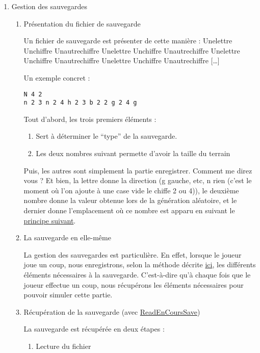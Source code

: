 \documentclass[letter]{article}
\begin{document}
\begin{enumerate}
\item Gestion des sauvegardes
\label{sec:org8335584}

\begin{enumerate}
\item Présentation du fichier de sauvegarde
\label{sec:org7d2c40d}




Un fichier de sauvegarde est présenter de cette manière :
Unelettre Unchiffre Unautrechiffre
Unelettre Unchiffre Unautrechiffre Unelettre Unchiffre Unautrechiffre Unelettre Unchiffre Unautrechiffre [\ldots{}]

Un exemple concret :
\begin{verbatim}
N 4 2
n 2 3 n 2 4 h 2 3 b 2 2 g 2 4 g 
\end{verbatim}

Tout d'abord, les trois premiers éléments :
\begin{enumerate}
\item Sert à déterminer le “type” de la sauvegarde.
\item Les deux nombres suivant permette d'avoir la taille du terrain
\end{enumerate}

Puis, les autres sont simplement la partie enregistrer.
Comment me direz vous ?
Et bien, la lettre donne la direction (g gauche, etc, n rien (c'est le moment où l'on ajoute à une case vide le chiffe 2 ou 4)), le deuxième nombre donne la valeur obtenue lors de la génération aléatoire, et le dernier donne l'emplacement où ce nombre est apparu en suivant le \hyperref[sec:orge1d9381]{principe suivant}.


\item La sauvegarde en elle-même
\label{sec:org0ed3ffd}

La gestion des sauvegardes est particulière.
En effet, lorsque le joueur joue un coup, nous enregistrons, selon la méthode décrite \hyperref[sec:org7d2c40d]{ici}, les différents éléments nécessaires à la sauvegarde.
C'est-à-dire qu'à chaque fois que le joueur effectue un coup, nous récupérons les éléments nécessaires pour pouvoir simuler cette partie.

\item Récupération de la sauvegarde (avec \hyperref[sec:org2ded51b]{ReadEnCoursSave})
\label{sec:orge1d9381}

La sauvegarde est récupérée en deux étapes :

\begin{enumerate}
\item Lecture du fichier
\label{sec:org35e1794}


\end{enumerate}
\end{enumerate}
\end{enumerate}
\end{document}
